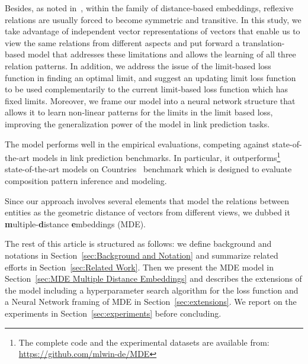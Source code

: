 \documentclass{ecai}
\begin{document}
Besides, as noted in~\cite{kazemi2018simple,sun2019rotate}, within the family of distance-based embeddings, reflexive relations are usually forced to become symmetric and transitive. In this study, we take advantage of independent vector representations of vectors that enable us to view the same relations from different aspects and put forward a translation-based model that addresses these limitations and allows the learning of all three relation patterns. 
In addition, we address the issue of the limit-based loss function in finding an optimal limit, and suggest an updating limit loss function to be used complementarily to the current limit-based loss function which has fixed limits. 
Moreover, we frame our model into a neural network structure that allows it to learn non-linear patterns for the limits in the limit based loss, improving the generalization power of the model in link prediction tasks.

The model performs well in the empirical evaluations, competing against state-of-the-art models in link prediction benchmarks. In particular, it outperforms\footnote{The complete code and the experimental datasets are available from: \url{https://github.com/mlwin-de/MDE}} state-of-the-art models on Countries~\cite{bouchard2015approximate} benchmark which is designed to evaluate composition pattern inference and modeling.

Since our approach involves several elements that model the relations between entities as the geometric distance of vectors from different views, we dubbed it \textbf{m}ultiple-\textbf{d}istance \textbf{e}mbeddings (MDE). 

The rest of this article is structured as follows: we define background and notations in Section~\ref{sec:Background and Notation} and summarize related efforts in Section~\ref{sec:Related Work}. Then we present the MDE model in Section~\ref{sec:MDE Multiple Distance Embeddings} and describes the extensions of the model including a hyperparameter search algorithm for the loss function and a Neural Network framing of MDE in Section~\ref{sec:extensions}. We report on the experiments in Section~\ref{sec:experiments} before concluding.
\end{document}
